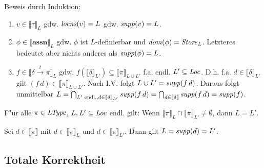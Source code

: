 \documentclass[12pt,a4paper,bigheadings]{scrartcl}
\newcommand{\semantic}[1]{\ensuremath{\llbracket#1\rrbracket}}
\newcommand{\assn}{\ensuremath{\mathbf{assn}}}
\newcommand{\locns}{\name{locns}}
\newcommand{\supp}{\name{supp}}
\newcommand{\tto}{\ensuremath{\xrightarrow{t}}}
\begin{document}
\begin{beweis}
  Beweis durch Induktion:
  \begin{enumerate}
    \item $v \in \semantic{\tau}_L$ gdw. $\locns(v) = L$ gdw. $\supp(v) = L$.

    \item $\phi \in \semantic{\assn}_L$ gdw. $\phi$ ist $L$-definierbar und ${\text{\it dom\/}}(\phi) = {\text{\it Store\/}}_L$.
          Letzteres bedeutet aber nichts anderes als $\supp(\phi) = L$.

    \item $f \in \semantic{\delta \tto \pi}_L$ gdw. $f(\semantic{\delta}_{L'}) \subseteq \semantic{\pi}_{L\cup L'}$
          f.a. endl. $L' \subseteq {\text{\it Loc\/}}$. D.h. f.a. $d \in \semantic{\delta}_{L'}$ gilt $(f\,d) \in \semantic{\pi}_{L \cup L'}$.
          Nach I.V. folgt $L \cup L' = \supp(f\,d)$. Daraus folgt unmittelbar
          $L = \bigcap_{L'\text{ endl.}, d\in\semantic{\delta}_{L'}} \supp(f\,d)
             = \bigcap_{d\in\semantic{\delta}} \supp(f\,d) = \supp(f)$.
  \end{enumerate}
\end{beweis}

\begin{korollar}
  F"ur alle $\pi\in{\text{\it LType\/}}$, $L,L' \subseteq {\text{\it Loc\/}}$ endl. gilt:
  Wenn $\semantic{\pi}_L \cap \semantic{\pi}_{L'} \ne \emptyset$, dann $L = L'$.
\end{korollar}

\begin{beweis}
  Sei $d \in \semantic{\pi}$ mit $d \in \semantic{\pi}_L$ und $d \in \semantic{\pi}_{L'}$.
  Dann gilt $L = \supp(d) = L'$.
\end{beweis}


\subsection{Totale Korrektheit}
\end{document}
